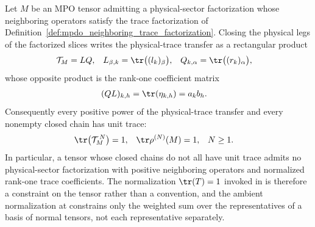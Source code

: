 \begin{lemma}
    \label{thm:mpdo_neighboring_trace_unit_closure}
    \leanok
    Let $M$ be an MPO tensor admitting a physical-sector factorization whose
    neighboring operators satisfy the trace factorization of
    Definition~\ref{def:mpdo_neighboring_trace_factorization}. Closing the
    physical legs of the factorized slices writes the physical-trace transfer
    as a rectangular product
    \begin{align}
        \mathcal T_M & =LQ,
                     & L_{\beta,k}  & =\tr\bigl((l_k)_\beta\bigr),
                     & Q_{k,\alpha} & =\tr\bigl((r_k)_\alpha\bigr),
        \notag
    \end{align}
    whose opposite product is the rank-one coefficient matrix
    \begin{align}
        (QL)_{k,h} & =\tr(\eta_{k,h})=a_kb_h.
        \notag
    \end{align}
    Consequently every positive power of the physical-trace transfer and
    every nonempty closed chain has unit trace:
    \begin{align}
        \tr\bigl(\mathcal T_M^{\,N}\bigr) & =1,
                                          & \tr\rho^{(N)}(M) & =1,
                                          & N                & \geq1.
        \notag
    \end{align}
    In particular, a tensor whose closed chains do not all have unit trace
    admits no physical-sector factorization with positive neighboring
    operators and normalized rank-one trace coefficients. The normalization
    $\tr(T)=1$ invoked in
    \cite[Appendix~C.2, line~1498]{Cirac2016MPDO_arXiv} is therefore a
    constraint on the tensor rather than a convention, and the ambient
    normalization at
    \cite[Appendix~C.2, lines~1755--1759]{Cirac2016MPDO_arXiv} constrains
    only the weighted sum over the representatives of a basis of normal
    tensors, not each representative separately.
\end{lemma}

